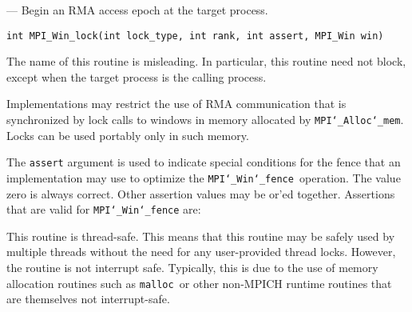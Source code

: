 \startmanpage
{}
--- Begin an RMA access epoch at the target process. 
\startvb\begin{verbatim}
int MPI_Win_lock(int lock_type, int rank, int assert, MPI_Win win)

\end{verbatim}
\endvb

\par
{}
\par
The name of this routine is misleading.  In particular, this
routine need not block, except when the target process is the calling
process.
\par
Implementations may restrict the use of RMA communication that is
synchronized
by lock calls to windows in memory allocated by {\tt MPI{\tt \char`\_}Alloc{\tt \char`\_}mem}. Locks can
be used portably only in such memory.
\par
The {\tt assert} argument is used to indicate special conditions for the
fence that an implementation may use to optimize the {\tt MPI{\tt \char`\_}Win{\tt \char`\_}fence
}operation.  The value zero is always correct.  Other assertion values
may be or'ed together.  Assertions that are valid for {\tt MPI{\tt \char`\_}Win{\tt \char`\_}fence} are:
\par
{}
\par
{}
\par
This routine is thread-safe.  This means that this routine may be
safely used by multiple threads without the need for any user-provided
thread locks.  However, the routine is not interrupt safe.  Typically,
this is due to the use of memory allocation routines such as {\tt malloc
}or other non-MPICH runtime routines that are themselves not interrupt-safe.
